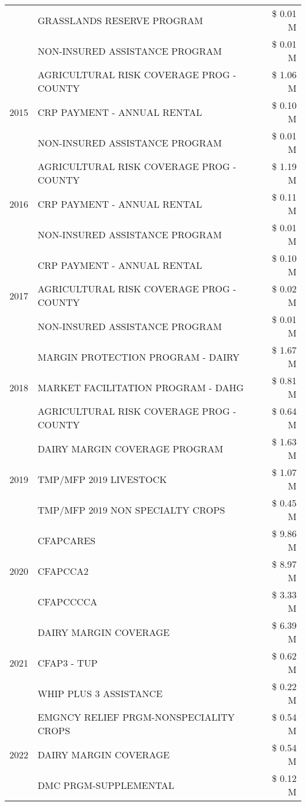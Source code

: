 \begin{tabular}{llr}
 & GRASSLANDS RESERVE PROGRAM & \$ 0.01 M \\
 & NON-INSURED ASSISTANCE PROGRAM & \$ 0.01 M \\
\cline{1-3}
\multirow[t]{3}{*}{2015} & AGRICULTURAL RISK COVERAGE PROG - COUNTY & \$ 1.06 M \\
 & CRP PAYMENT - ANNUAL RENTAL & \$ 0.10 M \\
 & NON-INSURED ASSISTANCE PROGRAM & \$ 0.01 M \\
\cline{1-3}
\multirow[t]{3}{*}{2016} & AGRICULTURAL RISK COVERAGE PROG - COUNTY & \$ 1.19 M \\
 & CRP PAYMENT - ANNUAL RENTAL & \$ 0.11 M \\
 & NON-INSURED ASSISTANCE PROGRAM & \$ 0.01 M \\
\cline{1-3}
\multirow[t]{3}{*}{2017} & CRP PAYMENT - ANNUAL RENTAL & \$ 0.10 M \\
 & AGRICULTURAL RISK COVERAGE PROG - COUNTY & \$ 0.02 M \\
 & NON-INSURED ASSISTANCE PROGRAM & \$ 0.01 M \\
\cline{1-3}
\multirow[t]{3}{*}{2018} & MARGIN PROTECTION PROGRAM - DAIRY & \$ 1.67 M \\
 & MARKET FACILITATION PROGRAM - DAHG & \$ 0.81 M \\
 & AGRICULTURAL RISK COVERAGE PROG - COUNTY & \$ 0.64 M \\
\cline{1-3}
\multirow[t]{3}{*}{2019} & DAIRY MARGIN COVERAGE PROGRAM & \$ 1.63 M \\
 & TMP/MFP 2019 LIVESTOCK & \$ 1.07 M \\
 & TMP/MFP 2019 NON SPECIALTY CROPS & \$ 0.45 M \\
\cline{1-3}
\multirow[t]{3}{*}{2020} & CFAPCARES & \$ 9.86 M \\
 & CFAPCCA2 & \$ 8.97 M \\
 & CFAPCCCCA & \$ 3.33 M \\
\cline{1-3}
\multirow[t]{3}{*}{2021} & DAIRY MARGIN COVERAGE & \$ 6.39 M \\
 & CFAP3 - TUP & \$ 0.62 M \\
 & WHIP PLUS 3 ASSISTANCE & \$ 0.22 M \\
\cline{1-3}
\multirow[t]{3}{*}{2022} & EMGNCY RELIEF PRGM-NONSPECIALITY CROPS & \$ 0.54 M \\
 & DAIRY MARGIN COVERAGE & \$ 0.54 M \\
 & DMC PRGM-SUPPLEMENTAL & \$ 0.12 M \\
\cline{1-3}
\bottomrule
\end{tabular}
